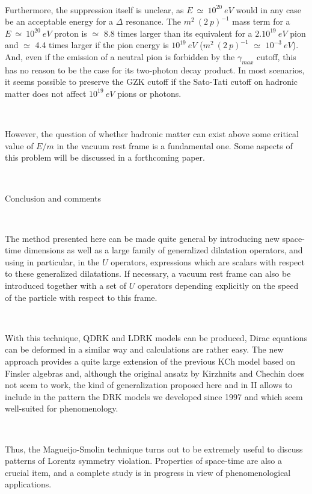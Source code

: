\documentclass[a4paper,12pt,dvips]{article}
\makeatletter
\renewcommand{\section}{\@startsection{section}{1}{0in}
	{0.4\baselineskip}{0.1\baselineskip}{\Large\bf}}
\makeatother
\begin{document}
~ 

Furthermore, the suppression itself is unclear, as $E ~ \simeq ~ 10^{20} ~ eV$ would in any case be an acceptable energy for a $\Delta $ resonance. The $m^2 ~ (2 ~ p)^{-1}$ mass term for a $E ~ \simeq ~ 10^{20} ~ eV$ proton is $\simeq $ 8.8 times larger than its equivalent for a $2. 10^{19} ~ eV $ pion  and $\simeq $ 4.4 times larger if the pion energy is $10^{19} ~ eV $ ($m^2 ~ (2 ~ p)^{-1} $ $\simeq $ $10^{-3} ~ eV$). And, even if the emission of a neutral pion is forbidden by the $\gamma _ {max}$ cutoff, this has no reason to be the case for its two-photon decay product. In most scenarios, it seems possible to preserve the GZK cutoff if the Sato-Tati cutoff on hadronic matter does not affect $10^{19} ~ eV $ pions or photons. 

~ 

However, the question of whether hadronic matter can exist above some critical value of $E/m$ in the vacuum rest frame is a fundamental one. Some aspects of this problem will be discussed in a forthcoming paper. 

~ 
~ 

\section{Conclusion and comments}
\label{concl.sec}

~

The method presented here can be made quite general by introducing new space-time dimensions as well as a large family of generalized dilatation operators, and using in particular, in the $U$ operators, expressions which are scalars with respect to these generalized dilatations. If necessary, a vacuum rest frame can also be introduced together with a set of $U$ operators depending explicitly on the speed of the particle with respect to this frame. 

~ 

With this technique, QDRK and LDRK models can be produced, Dirac equations can be deformed in a similar way and calculations are rather easy. The new approach provides a quite large extension of the previous KCh model based on Finsler algebras and, although the original ansatz by Kirzhnits and Chechin does not seem to work, the kind of generalization proposed here and in II allows to include in the pattern the DRK models we developed since 1997 and which seem well-suited for phenomenology.

~ 

Thus, the Magueijo-Smolin technique turns out to be extremely useful to discuss patterns of Lorentz symmetry violation. Properties of space-time are also a crucial item, and a complete study is in progress in view of phenomenological applications.
\end{document}
